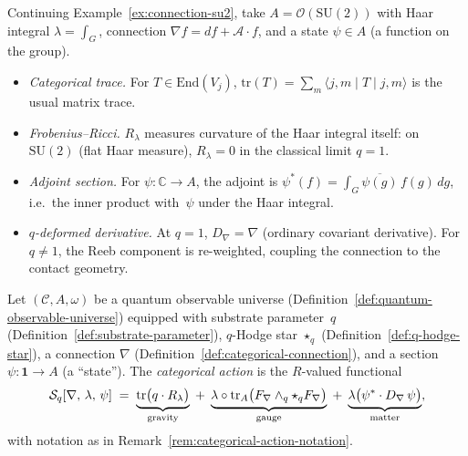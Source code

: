 \begin{example}
\label{ex:categorical-action-notation-su2}
Continuing Example~\ref{ex:connection-su2}, take
$A = \mathcal{O}(\mathrm{SU}(2))$ with Haar integral $\lambda = \int_G$,
connection $\nabla f = df + \mathcal{A} \cdot f$, and a state
$\psi \in A$ (a function on the group).
\begin{itemize}
  \item \emph{Categorical trace.}\;  For $T \in \mathrm{End}(V_j)$,
        $\mathrm{tr}(T) = \sum_m \langle j,m \mid T \mid j,m \rangle$
        is the usual matrix trace.
  \item \emph{Frobenius--Ricci.}\;  $R_\lambda$ measures curvature of
        the Haar integral itself: on $\mathrm{SU}(2)$ (flat Haar measure),
        $R_\lambda = 0$ in the classical limit $q = 1$.
  \item \emph{Adjoint section.}\;  For
        $\psi \colon \mathbb{C} \to A$, the adjoint is
        $\psi^*(f) = \int_G \overline{\psi(g)}\,f(g)\,dg$, i.e.\ the
        inner product with~$\psi$ under the Haar integral.
  \item \emph{$q$-deformed derivative.}\;  At $q = 1$,
        $D_\nabla = \nabla$ (ordinary covariant derivative).  For
        $q \neq 1$, the Reeb component is re-weighted, coupling the
        connection to the contact geometry.
\end{itemize}
\end{example}

\begin{definition}
\label{def:categorical-action}
Let $(\mathcal{C}, A, \omega)$ be a quantum observable universe
(Definition~\ref{def:quantum-observable-universe}) equipped with
substrate parameter~$q$ (Definition~\ref{def:substrate-parameter}),
$q$-Hodge star $\star_q$ (Definition~\ref{def:q-hodge-star}),
a connection $\nabla$ (Definition~\ref{def:categorical-connection}),
and a section $\psi \colon \mathbf{1} \to A$ (a ``state'').
The \emph{categorical action} is the $R$-valued functional
\begin{equation}\label{eq:categorical-action}
  \mathcal{S}_q[\nabla,\, \lambda,\, \psi]
  \;=\;
  \underbrace{%
    \mathrm{tr}\bigl(q \cdot R_\lambda\bigr)
  }_{\text{gravity}}
  \;+\;
  \underbrace{%
    \lambda \circ \mathrm{tr}_A\bigl(
      F_\nabla \wedge_q \star_q F_\nabla
    \bigr)
  }_{\text{gauge}}
  \;+\;
  \underbrace{%
    \lambda\bigl(\psi^* \cdot D_\nabla\,\psi\bigr)
  }_{\text{matter}},
\end{equation}
with notation as in Remark~\ref{rem:categorical-action-notation}.
\end{definition}


